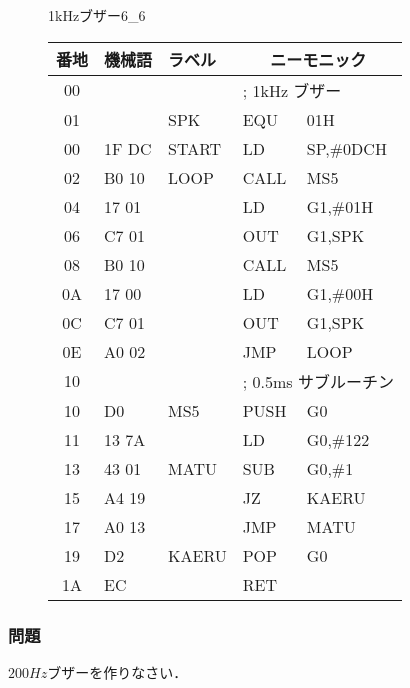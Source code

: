 \begin{figure}[btp]
\begin{reidai}{1kHzブザー}{6_6}
{{\footnotesize\tt\begin{center}
\begin{tabular}{|c|l|l| l l|} \hline
番地 & 機械語 & ラベル & \multicolumn{2}{c|}{ニーモニック} \\
\hline
00 &          &        &\multicolumn{2}{|l|}{; 1kHz ブザー} \\
01 &          & SPK    & EQU &    01H              \\
00 & 1F DC    & START  & LD  &    SP,\#0DCH        \\
02 & B0 10    & LOOP   & CALL&    MS5              \\
04 & 17 01    &        & LD  &    G1,\#01H         \\
06 & C7 01    &        & OUT &    G1,SPK           \\
08 & B0 10    &        & CALL&    MS5              \\
0A & 17 00    &        & LD  &    G1,\#00H         \\
0C & C7 01    &        & OUT &    G1,SPK           \\
0E & A0 02    &        & JMP &    LOOP             \\
10 &          &        &\multicolumn{2}{|l|}{; 0.5ms サブルーチン} \\
10 & D0       & MS5    & PUSH&    G0               \\ %
11 & 13 7A    &        & LD  &    G0,\#122         \\ %
13 & 43 01    & MATU   & SUB &    G0,\#1           \\ %
15 & A4 19    &        & JZ  &    KAERU            \\ %
17 & A0 13    &        & JMP &    MATU             \\ %
19 & D2       & KAERU  & POP &    G0               \\ %
1A & EC       &        & RET &                     \\ %
\hline
\end{tabular}
\end{center}}
}\end{reidai}
\end{figure}

\vfill
\subsubsection{問題}
$200Hz$ブザーを作りなさい．
\vfill

